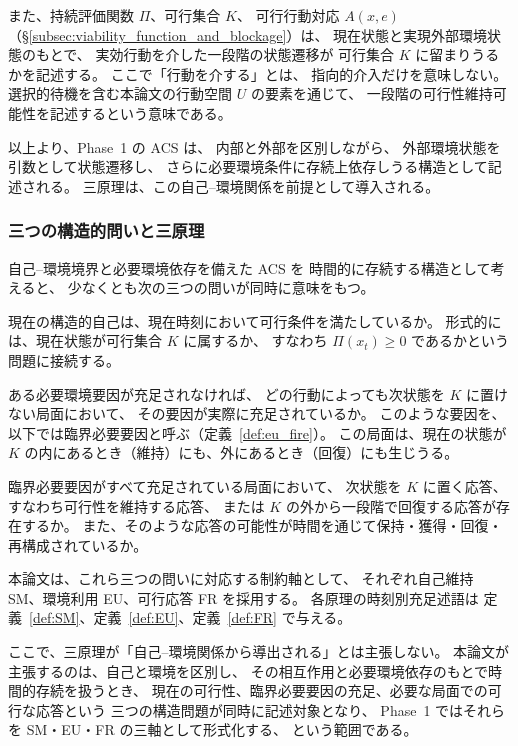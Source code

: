 また、持続評価関数 $\Pi$、可行集合 $K$、
可行行動対応 $A(x,e)$
（\S\ref{subsec:viability_function_and_blockage}）は、
現在状態と実現外部環境状態のもとで、
実効行動を介した一段階の状態遷移が
可行集合 $K$ に留まりうるかを記述する。
ここで「行動を介する」とは、
指向的介入だけを意味しない。
選択的待機を含む本論文の行動空間 $U$ の要素を通じて、
一段階の可行性維持可能性を記述するという意味である。

以上より、Phase~1 の ACS は、
内部と外部を区別しながら、
外部環境状態を引数として状態遷移し、
さらに必要環境条件に存続上依存しうる構造として記述される。
三原理は、この自己--環境関係を前提として導入される。

\subsubsection{三つの構造的問いと三原理}

自己--環境境界と必要環境依存を備えた ACS を
時間的に存続する構造として考えると、
少なくとも次の三つの問いが同時に意味をもつ。

\begin{description}[style=nextline]
  \item[問い1（構造的自己の可行性）]
  現在の構造的自己は、現在時刻において可行条件を満たしているか。
  形式的には、現在状態が可行集合 $K$ に属するか、
  すなわち $\Pi(x_t)\ge0$ であるかという問題に接続する。

  \item[問い2（臨界必要要因の充足）]
  ある必要環境要因が充足されなければ、
  どの行動によっても次状態を $K$ に置けない局面において、
  その要因が実際に充足されているか。
  このような要因を、以下では臨界必要要因と呼ぶ（定義~\ref{def:eu_fire}）。
  この局面は、現在の状態が $K$ の内にあるとき（維持）にも、外にあるとき（回復）にも生じうる。

  \item[問い3（必要な局面での可行な応答）]
  臨界必要要因がすべて充足されている局面において、
  次状態を $K$ に置く応答、すなわち可行性を維持する応答、
  または $K$ の外から一段階で回復する応答が存在するか。
  また、そのような応答の可能性が時間を通じて保持・獲得・回復・再構成されているか。
\end{description}

本論文は、これら三つの問いに対応する制約軸として、
それぞれ自己維持 SM、環境利用 EU、可行応答 FR を採用する。
各原理の時刻別充足述語は
定義~\ref{def:SM}、定義~\ref{def:EU}、定義~\ref{def:FR}
で与える。

ここで、三原理が「自己--環境関係から導出される」とは主張しない。
本論文が主張するのは、自己と環境を区別し、
その相互作用と必要環境依存のもとで時間的存続を扱うとき、
現在の可行性、臨界必要要因の充足、必要な局面での可行な応答という
三つの構造問題が同時に記述対象となり、
Phase~1 ではそれらを SM・EU・FR の三軸として形式化する、
という範囲である。

